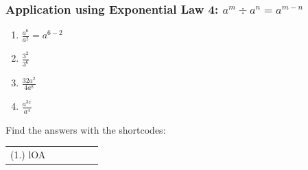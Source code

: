             \subsubsection{ Application using Exponential Law 4: ${a}^{m}÷{a}^{n}={a}^{m-n}$}
            \nopagebreak
        \label{m38359*id65493}\begin{enumerate}[noitemsep, label=\textbf{\arabic*}. ] 
            \label{m38359*uid25}\item 
            $\frac{{a}^{6}}{{a}^{2}}={a}^{6-2}$
      \label{m38359*uid26}\item 
        $\frac{{3}^{2}}{{3}^{6}}$
      \label{m38359*uid27}\item 
        $\frac{32{a}^{2}}{4{a}^{8}}$
      \label{m38359*uid28}\item 
        $\frac{{a}^{3x}}{{a}^{4}}$
\newline
\newline
          \end{enumerate}
      \label{m38359*uid29}
\par {} Find the answers with the shortcodes:
 \par \begin{tabular}[h]{cccccc}
 (1.) lOA  & \end{tabular}
